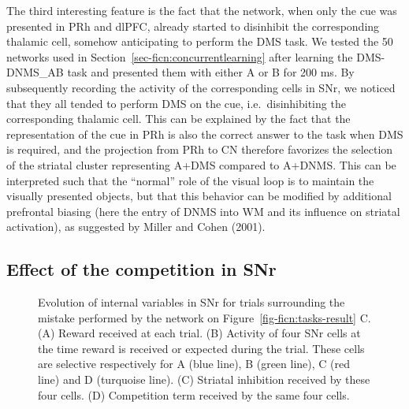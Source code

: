 \documentclass[
  11pt,
  a4paper,
]{scrbook}
\begin{document}
The third interesting feature is the fact that the network, when only
the cue was presented in PRh and dlPFC, already started to disinhibit
the corresponding thalamic cell, somehow anticipating to perform the DMS
task. We tested the 50 networks used in
Section~\ref{sec-ficn:concurrentlearning} after learning the
DMS-DNMS\_AB task and presented them with either A or B for 200 ms. By
subsequently recording the activity of the corresponding cells in SNr,
we noticed that they all tended to perform DMS on the cue,
i.e.~disinhibiting the corresponding thalamic cell. This can be
explained by the fact that the representation of the cue in PRh is also
the correct answer to the task when DMS is required, and the projection
from PRh to CN therefore favorizes the selection of the striatal cluster
representing A+DMS compared to A+DNMS. This can be interpreted such that
the ``normal'' role of the visual loop is to maintain the visually
presented objects, but that this behavior can be modified by additional
prefrontal biasing (here the entry of DNMS into WM and its influence on
striatal activation), as suggested by Miller and Cohen (2001).

\subsection{Effect of the competition in
SNr}\label{sec-ficn:competitionsnr}

\begin{figure}


\caption{\label{fig-ficn:competition-closeup}Evolution of internal
variables in SNr for trials surrounding the mistake performed by the
network on Figure~\ref{fig-ficn:tasks-result} C. (A) Reward received at
each trial. (B) Activity of four SNr cells at the time reward is
received or expected during the trial. These cells are selective
respectively for A (blue line), B (green line), C (red line) and D
(turquoise line). (C) Striatal inhibition received by these four cells.
(D) Competition term received by the same four cells.}

\end{figure}%
\end{document}
